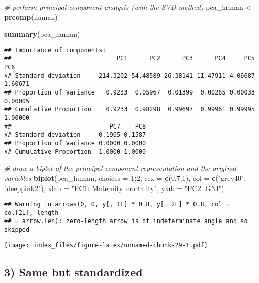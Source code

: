 \documentclass[]{article}
\newenvironment{Shaded}{\begin{snugshade}}{\end{snugshade}}
\newcommand{\KeywordTok}[1]{\textcolor[rgb]{0.13,0.29,0.53}{\textbf{#1}}}
\newcommand{\DataTypeTok}[1]{\textcolor[rgb]{0.13,0.29,0.53}{#1}}
\newcommand{\DecValTok}[1]{\textcolor[rgb]{0.00,0.00,0.81}{#1}}
\newcommand{\FloatTok}[1]{\textcolor[rgb]{0.00,0.00,0.81}{#1}}
\newcommand{\StringTok}[1]{\textcolor[rgb]{0.31,0.60,0.02}{#1}}
\newcommand{\CommentTok}[1]{\textcolor[rgb]{0.56,0.35,0.01}{\textit{#1}}}
\newcommand{\OperatorTok}[1]{\textcolor[rgb]{0.81,0.36,0.00}{\textbf{#1}}}
\newcommand{\NormalTok}[1]{#1}
\begin{document}
\begin{Shaded}
\begin{Highlighting}[]
\CommentTok{# perform principal component analysis (with the SVD method)}
\NormalTok{pca_human <-}\StringTok{ }\KeywordTok{prcomp}\NormalTok{(human)}

\KeywordTok{summary}\NormalTok{(pca_human)}
\end{Highlighting}
\end{Shaded}

\begin{verbatim}
## Importance of components:
##                             PC1      PC2      PC3      PC4     PC5     PC6
## Standard deviation     214.3202 54.48589 26.38141 11.47911 4.06687 1.60671
## Proportion of Variance   0.9233  0.05967  0.01399  0.00265 0.00033 0.00005
## Cumulative Proportion    0.9233  0.98298  0.99697  0.99961 0.99995 1.00000
##                           PC7    PC8
## Standard deviation     0.1905 0.1587
## Proportion of Variance 0.0000 0.0000
## Cumulative Proportion  1.0000 1.0000
\end{verbatim}

\begin{Shaded}
\begin{Highlighting}[]
\CommentTok{# draw a biplot of the principal component representation and the original variables}
\KeywordTok{biplot}\NormalTok{(pca_human, }\DataTypeTok{choices =} \DecValTok{1}\OperatorTok{:}\DecValTok{2}\NormalTok{, }\DataTypeTok{cex =} \KeywordTok{c}\NormalTok{(}\FloatTok{0.7}\NormalTok{,}\DecValTok{1}\NormalTok{), }\DataTypeTok{col =} \KeywordTok{c}\NormalTok{(}\StringTok{"grey40"}\NormalTok{, }\StringTok{"deeppink2"}\NormalTok{), }\DataTypeTok{xlab =} \StringTok{"PC1: Maternity mortality"}\NormalTok{, }\DataTypeTok{ylab =} \StringTok{"PC2: GNI"}\NormalTok{)}
\end{Highlighting}
\end{Shaded}

\begin{verbatim}
## Warning in arrows(0, 0, y[, 1L] * 0.8, y[, 2L] * 0.8, col = col[2L], length
## = arrow.len): zero-length arrow is of indeterminate angle and so skipped
\end{verbatim}

\texttt{[image: index\_files/figure-latex/unnamed-chunk-29-1.pdf]}

\subsection{3) Same but standardized}\label{same-but-standardized}
\end{document}
